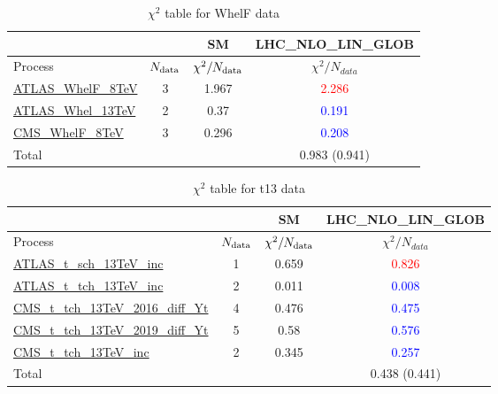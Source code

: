 \documentclass{article}
\begin{document}
\begin{table}[H]
\centering
\begin{tabular}{|l|c|c|c|}
\hline
 \multicolumn{2}{|c|}{} & SM& LHC_NLO_LIN_GLOB\\ \hline
Process & $N_{\rm data}$ & $\chi^ 2/N_{\rm data}$& $\chi^ 2/N_{data}$\\ \hline
\href{https://arxiv.org}{ATLAS_WhelF_8TeV} & 3 & 1.967 & \textcolor{red}                            {2.286} \\ \hline
\href{https://arxiv.org}{ATLAS_Whel_13TeV} & 2 & 0.37 & \textcolor{blue}                            {0.191} \\ \hline
\href{https://arxiv.org}{CMS_WhelF_8TeV} & 3 & 0.296 & \textcolor{blue}                            {0.208} \\ \hline
\hline Total & &  & 0.983 (0.941) \\ \hline
\end{tabular}
\caption{$\chi^2$ table for WhelF data}
\end{table}
\begin{table}[H]
\centering
\begin{tabular}{|l|c|c|c|}
\hline
 \multicolumn{2}{|c|}{} & SM& LHC_NLO_LIN_GLOB\\ \hline
Process & $N_{\rm data}$ & $\chi^ 2/N_{\rm data}$& $\chi^ 2/N_{data}$\\ \hline
\href{https://arxiv.org}{ATLAS_t_sch_13TeV_inc} & 1 & 0.659 & \textcolor{red}                            {0.826} \\ \hline
\href{https://arxiv.org}{ATLAS_t_tch_13TeV_inc} & 2 & 0.011 & \textcolor{blue}                            {0.008} \\ \hline
\href{https://arxiv.org}{CMS_t_tch_13TeV_2016_diff_Yt} & 4 & 0.476 & \textcolor{blue}                            {0.475} \\ \hline
\href{https://arxiv.org}{CMS_t_tch_13TeV_2019_diff_Yt} & 5 & 0.58 & \textcolor{blue}                            {0.576} \\ \hline
\href{https://arxiv.org}{CMS_t_tch_13TeV_inc} & 2 & 0.345 & \textcolor{blue}                            {0.257} \\ \hline
\hline Total & &  & 0.438 (0.441) \\ \hline
\end{tabular}
\caption{$\chi^2$ table for t13 data}
\end{table}
\end{document}
